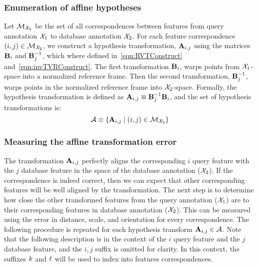         \subsubsection{Enumeration of affine hypotheses}
            Let $\mathcal{M}_{\mathcal{X}_{2}}$ be the set of all correspondences between features from query annotation
            $\mathcal{X}_{1}$ to database annotation $\mathcal{X}_{2}$. For each feature correspondence $(i, j) \in
            \mathcal{M}_{\mathcal{X}_{2}}$, we construct a hypothesis transformation, $\mathbf{A}_{i, j}$ using the matrices
            $\mathbf{B}_{i}$ and $\mathbf{B}_{j}^{-1}$, which where defined in~\cref{eqn:RVTConstruct}
            and~\cref{eqn:invTVRConstruct}. The first transformation $\mathbf{B}_{i}$, warps points from
            $\mathcal{X}_{1}$-space into a normalized reference frame. Then the second transformation, $\mathbf{B}_{j}^{-1}$,
            warps points in the normalized reference frame into $\mathcal{X}_{2}$-space. Formally, the hypothesis
            transformation is defined as $\mathbf{A}_{i, j} \equiv \mathbf{B}_{j}^{-1}\mathbf{B}_{i}$, and the set of hypothesis
            transformations is:
            \begin{equation}
                \mathcal{A} \equiv \left\{ \mathbf{A}_{i, j} \mid (i, j) \in \mathcal{M}_{\mathcal{X}_{2}} \right\}
            \end{equation}

        \subsubsection{Measuring the affine transformation error}
            The transformation $\mathbf{A}_{i, j}$ perfectly aligns the corresponding $i$\th{} query feature with the
            $j$\th{} database feature in the space of the database annotation ($\mathcal{X}_{2}$). If the correspondence
            is indeed correct, then we can expect that other corresponding features will be well aligned by the
            transformation. The next step is to determine how close the other transformed features from the query
            annotation ($\mathcal{X}_{1}$) are to their corresponding features in database annotation ($\mathcal{X}_{2}$). This
            can be measured using the error in distance, scale, and orientation for every correspondence. The
            following procedure is repeated for each hypothesis transform %
            $\mathbf{A}_{i, j} \in \mathcal{A}$. Note that the following description is in the context of the $i$\th{} query
            feature and the $j$\th{} database feature, and the $i,j$ suffix is omitted for clarity. In this
            context, the suffixes $k$ and $\ell$ will be used to index into features correspondences.

